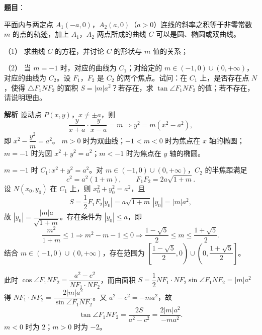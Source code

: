 \begin{answer}

\textbf{题目}：

平面内与两定点 $A_1(-a,0)$，$A_2(a,0)$（$a>0$）连线的斜率之积等于非零常数 $m$ 的点的轨迹，加上 $A_1$，$A_2$ 两点所成的曲线 $C$ 可以是圆、椭圆或双曲线。

（1） 求曲线 $C$ 的方程，并讨论 $C$ 的形状与 $m$ 值的关系；

（2） 当 $m=-1$ 时，对应的曲线为 $C_1$；对给定的 $m\in(-1,0)\cup(0,+\infty)$，对应的曲线为 $C_2$。设 $F_1$，$F_2$ 是 $C_2$ 的两个焦点。试问：在 $C_1$ 上，是否存在点 $N$，使得 $\triangle F_1NF_2$ 的面积 $S=|m|a^2$？若存在，求 $\tan\angle F_1NF_2$ 的值；若不存在，请说明理由。

\textbf{解析}
设动点 $P(x,y)$，$x\neq\pm a$，则
\nopagebreak[4]
\[\frac{y}{x+a}\cdot\frac{y}{x-a}=m\Longrightarrow y^2=m(x^2-a^2),\]
即 $x^2-\dfrac{y^2}{m}=a^2$。
$m>0$ 时为双曲线；$-1<m<0$ 时为焦点在 $x$ 轴的椭圆；$m=-1$ 时为圆 $x^2+y^2=a^2$；$m<-1$ 时为焦点在 $y$ 轴的椭圆。

$m=-1$ 时 $C_1:x^2+y^2=a^2$。对 $m\in(-1,0)\cup(0,+\infty)$，$C_2$ 的半焦距满足
\nopagebreak[4]
\[c^2=a^2(1+m),\qquad F_1F_2=2a\sqrt{1+m}.\]
设 $N(x_0,y_0)$ 在 $C_1$ 上，则 $x_0^2+y_0^2=a^2$，且
\nopagebreak[4]
\[S=\frac12F_1F_2|y_0|=a\sqrt{1+m}\,|y_0|=|m|a^2,\]
故 $|y_0|=\dfrac{|m|a}{\sqrt{1+m}}$。存在条件为 $|y_0|\leqslant a$，即
\nopagebreak[4]
\[\frac{m^2}{1+m}\leqslant1\Longrightarrow m^2-m-1\leqslant0\Longrightarrow\frac{1-\sqrt5}2\leqslant m\leqslant\frac{1+\sqrt5}2.\]
结合 $m\in(-1,0)\cup(0,+\infty)$，存在范围为 $\left[\dfrac{1-\sqrt5}2,0\right)\cup\left(0,\dfrac{1+\sqrt5}2\right]$。

此时 $\cos\angle F_1NF_2=\dfrac{a^2-c^2}{NF_1\cdot NF_2}$，而由面积 $S=\dfrac12NF_1\cdot NF_2\sin\angle F_1NF_2=|m|a^2$ 得 $NF_1\cdot NF_2=\dfrac{2|m|a^2}{\sin\angle F_1NF_2}$。又 $a^2-c^2=-ma^2$，故
\nopagebreak[4]
\[\tan\angle F_1NF_2=\frac{2S}{a^2-c^2}=\frac{2|m|a^2}{-ma^2}.\]
$m<0$ 时为 $2$；$m>0$ 时为 $-2$。



\end{answer}
